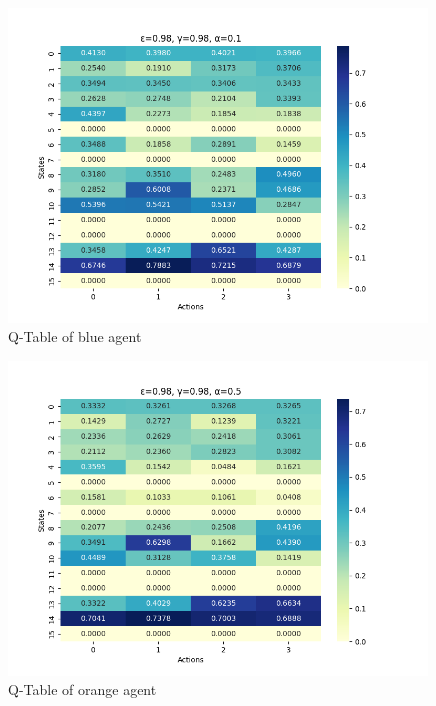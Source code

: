 \begin{figure}[H]
    \centering
    \includegraphics[width=0.99\textwidth]{images/heatmap_nd1.png}
    \caption{Q-Table of blue agent}
    \label{fig:blue_agent_nd}
\end{figure}
\begin{figure}[H]
    \centering
    \includegraphics[width=0.99\textwidth]{images/heatmap_nd2.png}
    \caption{Q-Table of orange agent}
    \label{fig:orange_agent_nd}
\end{figure}
